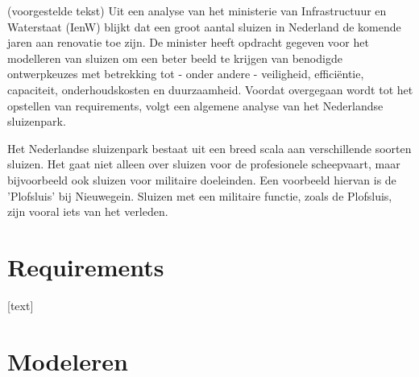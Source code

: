 \documentclass{article}
\begin{document}
		(voorgestelde tekst)
		Uit een analyse van het ministerie van Infrastructuur en Waterstaat (IenW) blijkt dat een groot aantal sluizen in Nederland de komende jaren aan renovatie toe zijn. De minister heeft opdracht gegeven voor het modelleren van sluizen om een beter beeld te krijgen van benodigde ontwerpkeuzes met betrekking tot - onder andere - veiligheid, efficiëntie, capaciteit, onderhoudskosten en duurzaamheid. Voordat overgegaan wordt tot het opstellen van requirements, volgt een algemene analyse van het Nederlandse sluizenpark. 

		Het Nederlandse sluizenpark bestaat uit een breed scala aan verschillende soorten sluizen. Het gaat niet alleen over sluizen voor de profesionele scheepvaart, maar bijvoorbeeld ook sluizen voor militaire doeleinden. \cite{} Een voorbeeld hiervan is de 'Plofsluis' bij Nieuwegein. \cite{rijkswaterstaatPlofsluis} Sluizen met een militaire functie, zoals de Plofsluis, zijn vooral iets van het verleden.

	
	\newpage
	
	
	\section{Requirements}
	

		[text]

	
	\newpage

	
	\section{Modeleren}
	
\end{document}

